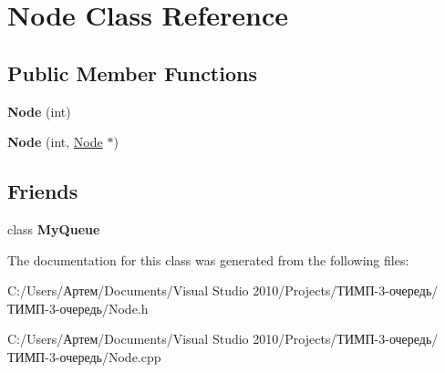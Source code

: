 \hypertarget{class_node}{}\section{Node Class Reference}
\label{class_node}
\subsection*{Public Member Functions}
\begin{DoxyCompactItemize}
\item 
\hypertarget{class_node_aff71d952af8363f046a67a8b12194e46}{}{\bfseries Node} (int)\label{class_node_aff71d952af8363f046a67a8b12194e46}

\item 
\hypertarget{class_node_aff31c12e14a6f00952a46ff967db0c96}{}{\bfseries Node} (int, \hyperlink{class_node}{Node} $\ast$)\label{class_node_aff31c12e14a6f00952a46ff967db0c96}

\end{DoxyCompactItemize}
\subsection*{Friends}
\begin{DoxyCompactItemize}
\item 
\hypertarget{class_node_a984423103c26b14cb60075a02ac86265}{}class {\bfseries My\+Queue}\label{class_node_a984423103c26b14cb60075a02ac86265}

\end{DoxyCompactItemize}


The documentation for this class was generated from the following files\+:\begin{DoxyCompactItemize}
\item 
C\+:/\+Users/Артем/\+Documents/\+Visual Studio 2010/\+Projects/ТИМП-\/3-\/очередь/ТИМП-\/3-\/очередь/Node.\+h\item 
C\+:/\+Users/Артем/\+Documents/\+Visual Studio 2010/\+Projects/ТИМП-\/3-\/очередь/ТИМП-\/3-\/очередь/Node.\+cpp\end{DoxyCompactItemize}
